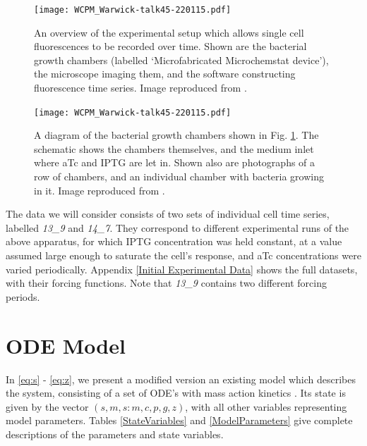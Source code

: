 \documentclass[10pt,journal]{./IEEE_latex_class/IEEEtran}
\begin{document}
\begin{figure}
    \centering
		\texttt{[image: WCPM\_Warwick-talk45-220115.pdf]}
        \caption{An overview of the experimental setup which allows single cell fluorescences to be recorded over time. Shown are the bacterial growth chambers (labelled `Microfabricated Microchemstat device'), the microscope imaging them, and the software constructing fluorescence time series. Image reproduced from \cite{Jaramillo}. }
            \label{ExperimentalSetup_overview}
\end{figure}
\begin{figure}
    \centering
	\texttt{[image: WCPM\_Warwick-talk45-220115.pdf]}
        \caption{A diagram of the bacterial growth chambers shown in Fig. \ref{ExperimentalSetup_overview}. The schematic shows the chambers themselves, and the medium inlet where aTc and IPTG are let in. Shown also are photographs of a row of chambers, and an individual chamber with bacteria growing in it. Image reproduced from \cite{Jaramillo}.}
    \label{ExperimentalSetup_chambers}
\end{figure}

The data we will consider consists of two sets of individual cell time series, labelled \textit{13\_9} and \textit{14\_7}. They correspond to different experimental runs of the above apparatus, for which IPTG concentration was held constant, at a value assumed large enough to saturate the cell's response, and aTc concentrations were varied periodically. Appendix \ref{Initial  Experimental Data} shows the full datasets, with their forcing functions. Note that \textit{13\_9} contains two different forcing periods.




\section{ODE Model}
\label{ODEModel}

In \eqref{eq:s} - \eqref{eq:z}, we present a modified version an existing model which describes the system, consisting of a set of ODE's with mass action kinetics \cite{UriAlon}.  Its state is given by the vector $(s,m,s:m,c,p,g,z)$, with all other variables representing model parameters. Tables \ref{StateVariables} and \ref{ModelParameters} give complete descriptions of the parameters and state variables.
 
\end{document}
